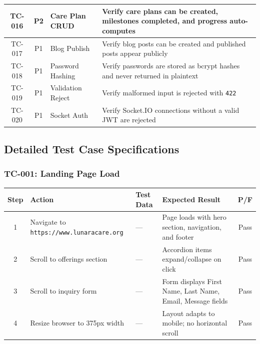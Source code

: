 \documentclass[12pt,letterpaper]{article}
\begin{document}
{\begin{longtable}{|c|c|>{\raggedright\arraybackslash}p{3cm}|>{\raggedright\arraybackslash}p{6.5cm}|}
TC-016 & P2 & Care Plan CRUD & Verify care plans can be created, milestones completed, and progress auto-computes \\
\hline
TC-017 & P1 & Blog Publish & Verify blog posts can be created and published posts appear publicly \\
\hline
\rowcolor{TableRowAlt}
TC-018 & P1 & Password Hashing & Verify passwords are stored as bcrypt hashes and never returned in plaintext \\
\hline
TC-019 & P1 & Validation Reject & Verify malformed input is rejected with \texttt{422} \\
\hline
\rowcolor{TableRowAlt}
TC-020 & P1 & Socket Auth & Verify Socket.IO connections without a valid JWT are rejected \\
\hline
\end{longtable}
}

\subsection{Detailed Test Case Specifications}

\subsubsection*{TC-001: Landing Page Load}

\begin{table}[!htbp]
\centering
\small
\begin{tabularx}{\textwidth}{|c|>{\raggedright\arraybackslash}X|>{\raggedright\arraybackslash}p{2cm}|>{\raggedright\arraybackslash}X|c|}
\hline
\rowcolor{TableHeader}\textcolor{TableHeaderText}{\textbf{Step}} & \textcolor{TableHeaderText}{\textbf{Action}} & \textcolor{TableHeaderText}{\textbf{Test Data}} & \textcolor{TableHeaderText}{\textbf{Expected Result}} & \textcolor{TableHeaderText}{\textbf{P/F}} \\
\hline
1 & Navigate to \texttt{https://www.lunaracare.org} & --- & Page loads with hero section, navigation, and footer & Pass \\
\hline
\rowcolor{TableRowAlt}
2 & Scroll to offerings section & --- & Accordion items expand/collapse on click & Pass \\
\hline
3 & Scroll to inquiry form & --- & Form displays First Name, Last Name, Email, Message fields & Pass \\
\hline
\rowcolor{TableRowAlt}
4 & Resize browser to 375px width & --- & Layout adapts to mobile; no horizontal scroll & Pass \\
\hline
\end{tabularx}
\end{table}
\end{document}
